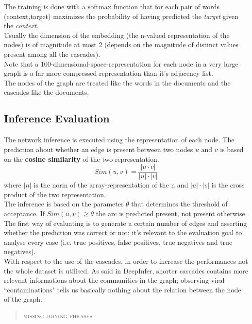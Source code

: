 \documentclass{article}
\begin{document}
			The training is done with a softmax function that for each pair of words (context,target) maximizes the probability of having predicted the \textit{target} given the \textit{context}.\medskip\\
			Usually the dimension of the embedding (the n-valued representation of the nodes) is of magnitude at most 2 (depends on the magnitude of distinct values present among all the cascades).\\
			Note that a 100-dimensional-space-representation for each node in a very large graph is a far more compressed representation than it's adjacency list.\medskip\\
			The nodes of the graph are treated like the words in the documents and the cascades like the documents.
		\subsection{Inference Evaluation}
			\paragraph{}
			The network inference is executed using the representation of each node. The prediction about whether an edge is present between two nodes $u$ and $v$ is based on the \textbf{cosine similarity} of the two representation.
			$$ Sim(u,v) = \frac{|u\cdot v|}{|u|\cdot |v|} $$
			where $|n|$ is the norm of the array-representation of the n and $|u|\cdot |v|$ is the cross product of the two representation.\\
			The inference is based on the parameter $\theta$ that determines the threshold of acceptance. If $Sim(u,v) \ge \theta$ the arc is predicted present, not present otherwise.\\
			The first way of evaluating is to generate a certain number of edges and asserting whether the prediction was correct or not; it's relevant to the evaluation goal to analyse every case (i.e. true positives, false positives, true negatives and true negatives).\medskip\\

			With respect to the use of the cascades, in order to increase the performances not the whole dataset is utilised. As said in DeepInfer, shorter cascades contains more relevant informations about the communities in the graph; observing viral \textquotedblleft contaminations" tells us basically nothing about the relation between the node of the graph. \\
			\begin{quote}
				\centering
				\textsc{missing joining phrases}\\
			\end{quote}
\end{document}
